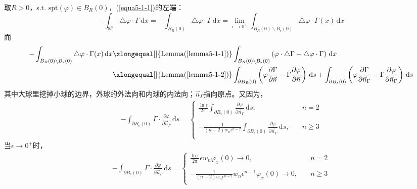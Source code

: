 \documentclass[11pt, a4paper]{article}
\theoremstyle{theorem}
\newcommand{\intd}[1]{\,\mathrm{d}{#1}}
\begin{document}
 取$R >0$，s.t. $\mathrm{spt}(\varphi) \in B_R(0)$，(\ref{equa5-1-1})的左端：
 $$
 - \int_{\mathbb{R}^n} \triangle \varphi \cdot \Gamma \intd x = - \int_{B_R(0)} \triangle \varphi \cdot \Gamma \intd x = \lim\limits_{\epsilon \rightarrow 0^+} \int_{B_R(0) \backslash B_\epsilon(0)} \triangle \varphi \cdot \Gamma(x) \intd x
 $$
 而
 \begin{align*}
     - \int_{B_R(0) \backslash B_\epsilon(0)} \triangle \varphi \cdot \Gamma(x) \intd x
     &\xlongequal[]{\mathrm{Lemma} (\ref{lemma5-1-1})} \int_{B_R(0) \backslash B_\epsilon(0)} \left(\varphi \cdot \triangle \Gamma - \triangle \varphi \cdot \Gamma\right) \intd x \\
     &\xlongequal[]{\mathrm{Lemma} (\ref{lemma5-1-2})} \int_{\partial B_R(0)} \left(\varphi \frac{\partial \Gamma}{\partial \vec{n}} - \Gamma \frac{\partial \varphi}{\partial \vec{n}}\right) \intd s + \int_{\partial B_\epsilon(0)} \left(\varphi \frac{\partial \Gamma}{\partial \vec{n}_\Gamma} - \Gamma \frac{\partial \varphi}{\partial \vec{n}_\Gamma}\right) \intd s
 \end{align*}
其中大球里挖掉小球的边界，外球的外法向和内球的内法向；$\vec{n}_\Gamma$指向原点。又因为，
\begin{align*}
    - \int_{\partial B_\epsilon(0)} \Gamma \cdot \frac{\partial \varphi}{\partial \vec{n}_\Gamma} \intd s = \begin{cases}
      \displaystyle\frac{\ln\epsilon}{2\pi} \int_{\partial B_\epsilon(0)} \frac{\partial \varphi}{\partial \vec{n}_\Gamma} \intd s, \quad & n = 2 \\
       \\
      \displaystyle - \frac{1}{(n-2)w_n \epsilon^{n-2}} \int_{\partial B_\epsilon(0)} \frac{\partial \varphi}{\partial \vec{n}_\Gamma} \intd s, \quad & n \geq 3 \\
    \end{cases}
\end{align*}
当$\epsilon \rightarrow 0^+$时，
\begin{align*}
    - \int_{\partial B_\epsilon(0)} \Gamma \cdot \frac{\partial \varphi}{\partial \vec{n}_\Gamma} \intd s = \begin{cases}
      \displaystyle\frac{\ln\epsilon}{2\pi} \epsilon w_n \varphi_x(0) \longrightarrow 0,  \quad & n = 2 \\
       \\
      \displaystyle - \frac{1}{(n-2)w_n \epsilon^{n-2}} w_n \epsilon^{n-1} \varphi_x(0) \longrightarrow 0, \quad & n \geq 3 \\
    \end{cases}
\end{align*}
\end{document}
